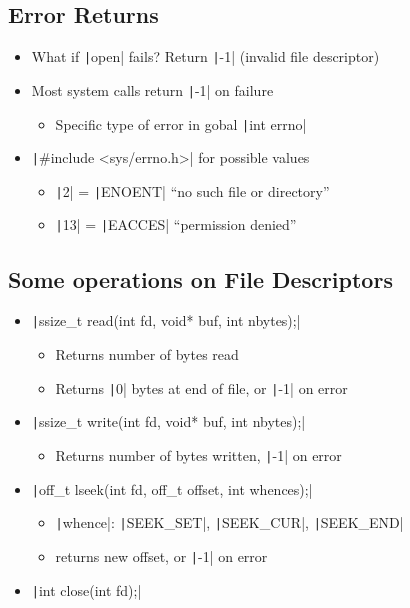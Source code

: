 \subsection{Error Returns}
\begin{itemize}[nosep]
    \item What if \texttt|open| fails? Return \texttt|-1| (invalid file descriptor)
    \item Most system calls return \texttt|-1| on failure
          \begin{itemize}[nosep]
              \item Specific type of error in gobal \texttt|int errno|
          \end{itemize}
    \item \texttt|#include <sys/errno.h>| for possible values
          \begin{itemize}
              \item \texttt|2| = \texttt|ENOENT| ``no such file or directory''
              \item \texttt|13| = \texttt|EACCES| ``permission denied''
          \end{itemize}
\end{itemize}
\subsection{Some operations on File Descriptors}
\begin{itemize}[nosep]
    \item \texttt|ssize_t read(int fd, void* buf, int nbytes);|
          \begin{itemize}[nosep]
              \item Returns number of bytes read
              \item Returns \texttt|0| bytes at end of file, or \texttt|-1| on error
          \end{itemize}
    \item \texttt|ssize_t write(int fd, void* buf, int nbytes);|
          \begin{itemize}[nosep]
              \item Returns number of bytes written, \texttt|-1| on error
          \end{itemize}
    \item \texttt|off_t lseek(int fd, off_t offset, int whences);|
          \begin{itemize}[nosep]
              \item \texttt|whence|: \texttt|SEEK_SET|, \texttt|SEEK_CUR|, \texttt|SEEK_END|
              \item returns new offset, or \texttt|-1| on error
          \end{itemize}
    \item \texttt|int close(int fd);|
\end{itemize}
